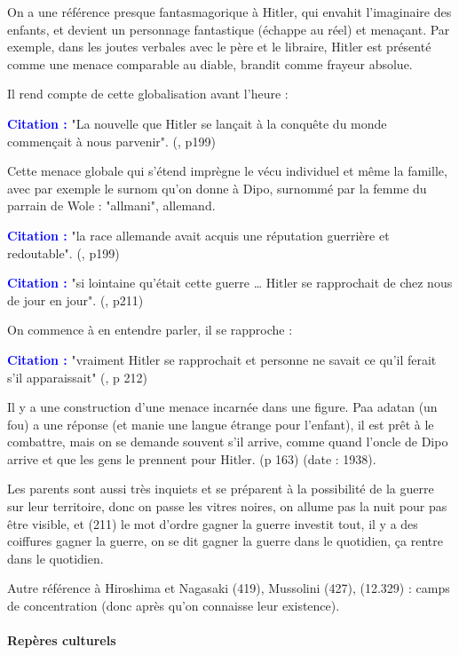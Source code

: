 \documentclass[a4paper, 11pt, hidelinks]{article}
\newcommand{\bs}{\bigskip}
\newcommand{\cit}{\large \textcolor{blue}{\textbf{Citation :}} \large }
\newcommand{\rb}[1]{\Romanbar{#1}}
\begin{document}
On a une référence presque fantasmagorique à Hitler, qui envahit l'imaginaire des enfants, et devient 
un personnage fantastique (échappe au réel) et menaçant. 
Par exemple, dans les joutes verbales avec le père et le libraire, Hitler est présenté comme une menace 
comparable au diable, brandit comme frayeur absolue.
\smallskip

Il rend compte de cette globalisation avant l'heure :

\cit "La nouvelle que Hitler se lançait à la conquête du monde commençait à nous parvenir". (\rb{7}, p199)

\bs 

Cette menace globale qui s'étend imprègne le vécu individuel et même la famille, avec par exemple le 
surnom qu'on donne à Dipo, surnommé par la femme du parrain de Wole : "allmani", allemand.


\cit "la race allemande avait acquis une réputation guerrière et redoutable". (\rb{7}, p199)


\cit "si lointaine qu'était cette guerre … Hitler se rapprochait de chez nous de jour en jour". (\rb{8}, p211)

\bs
On commence à en entendre parler, il se rapproche :

\cit "vraiment Hitler se rapprochait et personne ne savait ce qu'il ferait s'il apparaissait" (\rb{7}, p 212)

\bs
Il y a une construction d'une menace incarnée dans une figure. Paa adatan (un fou) a une réponse 
(et manie une langue étrange pour l'enfant), il est prêt à le combattre, mais on se demande souvent 
s'il arrive, comme quand l'oncle de Dipo arrive et que les gens le prennent pour Hitler. (p 163)
(date : 1938). 

\bs

Les parents sont aussi très inquiets et se préparent à la possibilité de la guerre sur leur territoire, 
donc on passe les vitres noires, on allume pas la nuit pour pas être visible, et (211) 
le mot d'ordre gagner la guerre investit tout, il y a des coiffures gagner la 
guerre, on se dit gagner la guerre dans le quotidien, ça rentre dans le quotidien.
\bs

Autre référence à Hiroshima et Nagasaki (419), Mussolini (427), (12.329) : camps de concentration (donc 
après qu'on connaisse leur existence).


\paragraph{Repères culturels}
\end{document}
